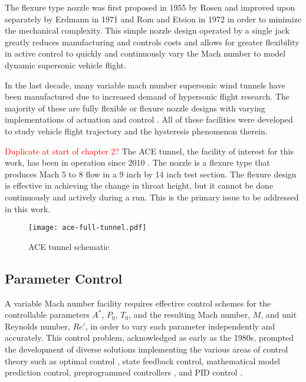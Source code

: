 The flexure type nozzle was first proposed in 1955 by Rosen \cite{rosen} and improved upon separately by Erdmann in 1971\cite{erdmann} and Rom and Etsion in 1972 \cite{erdmann,rom} in order to minimize the mechanical complexity. This simple nozzle design operated by a single jack greatly reduces manufacturing and controls costs and allows for greater flexibility in active control to quickly and continuously vary the Mach number to model dynamic supersonic vehicle flight.

In the last decade, many variable mach number supersonic wind tunnels have been manufactured due to increased demand of hypersonic flight research. The majority of these are fully flexible or flexure nozzle designs with varying implementations of actuation and control \cite{ilic-1,shahrbabaki-1,durand,laguarda,chen,guo,lv,qi,steeves}. All of these facilities were developed to study vehicle flight trajectory and the hysteresis phenomenon therein.

\textcolor{red}{Duplicate at start of chapter 2?} The ACE tunnel, the facility of interest for this work, has been in operation since 2010 \cite{ace09,ace10-calibrate,tichenor-dis}. The nozzle is a flexure type that produces Mach 5 to 8 flow in a 9 inch by 14 inch test section. The flexure design is effective in achieving the change in throat height, but it cannot be done continuously and actively during a run. This is the primary issue to be addressed in this work.

\begin{figure}[ht!]
    \centering
    \texttt{[image: ace-full-tunnel.pdf]}
    \caption{ACE tunnel schematic}
    \label{fig:ace-full-tunnel}
\end{figure}

\subsection{Parameter Control}
A variable Mach number facility requires effective control schemes for the controllable parameters $A^*$, $P_0$, $T_0$, and the resulting Mach number, $M$, and unit Reynolds number, $Re'$, in order to vary each parameter independently and accurately. This control problem, acknowledged as early as the 1980s, prompted the development of diverse solutions implementing the various areas of control theory such as optimal control \cite{kraft,hwang}, state feedback control, mathematical model prediction control, preprogrammed controllers \cite{matsumoto}, and PID control \cite{fung,ilic-2,silva}.

